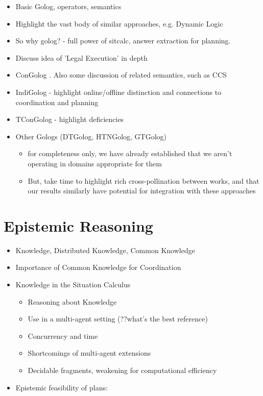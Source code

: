 \begin{itemize}
\item Basic Golog, operators, semantics \cite{levesque97golog}
\item Highlight the vast body of similar approaches, e.g. Dynamic Logic
\item So why golog? - full power of sitcalc, answer extraction for planning.
\item Discuss idea of 'Legal Execution' in depth
\item ConGolog \cite{giacomo00congolog}.  Also some discussion of related
semantics, such as CCS 
\item IndiGolog - highlight online/offline distinction and connections to coordination and planning \cite{giacomo99indigolog}
\item TConGolog - highlight deficiencies \cite{pinto99tcongolog}
\item Other Gologs (DTGolog, HTNGolog, GTGolog)
  \begin{itemize}
  \item for completeness only, we have already established that we aren't operating in domains appropriate for them
  \item But, take time to highlight rich cross-pollination between works, and that our results similarly have potential for integration with these approaches
  \end{itemize}
\end{itemize}

\section{Epistemic Reasoning}

\begin{itemize}
\item Knowledge, Distributed Knowledge, Common Knowledge \cite{halpern90knowledge_distrib,fagin95}
\item Importance of Common Knowledge for Coordination
\item Knowledge in the Situation Calculus
  \begin{itemize}
  \item Reasoning about Knowledge \cite{moore80know_act,scherl03sc_knowledge}
  \item Use in a multi-agent setting (??what's the best reference)
  \item Concurrency and time \cite{scherl03conc_knowledge}
  \item Shortcomings of multi-agent extensions
  \item Decidable fragments, weakening for computational efficiency
  \end{itemize}
\item Epistemic feasibility of plans: \cite{giacomo04sem_delib_indigolog,Lesperance01epi_feas_casl}
\end{itemize}

